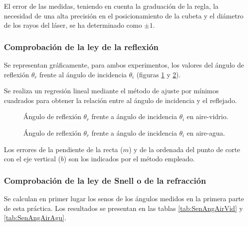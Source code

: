 \documentclass[a4paper,twocolumn]{article}
\begin{document}
            El error de las medidas, teniendo en cuenta la graduación de la regla, la necesidad de una alta precisión en el posicionamiento de la cubeta y el diámetro de los rayos del láser, se ha determinado como $\pm 1$\textdegree.

        \subsubsection{Comprobación de la ley de la reflexión}
        
            Se representan gráficamente, para ambos experimentos, los valores del ángulo de reflexión $\theta_r$ frente al ángulo de incidencia $\theta_i$ (figuras \ref{fig:AngReflAirVid} y \ref{fig:AngReflAirAgu}).
            
            Se realiza un regresión lineal mediante el método de ajuste por mínimos cuadrados para obtener la relación entre al ángulo de incidencia y el reflejado.
	
        	\begin{figure}[ht!]
        		\centering
        		
        		\caption{Ángulo de reflexión $\theta_r$ frente a ángulo de incidencia $\theta_i$ en aire-vidrio.}
        		\label{fig:AngReflAirVid}
        	\end{figure}

        	\begin{figure}[ht!]
            	\centering
            	
            	\caption{Ángulo de reflexión $\theta_r$ frente a ángulo de incidencia $\theta_i$ en aire-agua.}
        		\label{fig:AngReflAirAgu}
            \end{figure}
            
            Los errores de la pendiente de la recta ($m$) y de la ordenada del punto de corte con el eje vertical ($b$) son los indicados por el método empleado.

        \subsubsection{Comprobación de la ley de Snell o de la refracción}

            Se calculan en primer lugar los senos de los ángulos medidos en la primera parte de esta práctica. Los resultados se presentan en las tablas \ref{tab:SenAngAirVid} y \ref{tab:SenAngAirAgu}.
\end{document}
